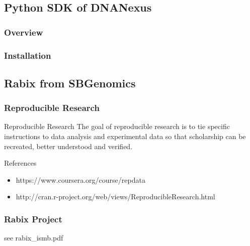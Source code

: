 \documentclass[UTF8]{beamer}
\begin{document}
\subsection{Python SDK of DNANexus}

\begin{frame}
  \frametitle{Overview}
\end{frame}

\begin{frame}
  \frametitle{Installation}
\end{frame}

\subsection{Rabix from SBGenomics}

\begin{frame}
  \frametitle{Reproducible Research}
  \begin{block}{Reproducible Research}
The goal of reproducible research is to tie specific instructions to data
analysis and experimental data so that scholarship can be recreated, better understood and verified.
  \end{block}
  \begin{block}{References}
    \begin{itemize}
      \item https://www.coursera.org/course/repdata
      \item http://cran.r-project.org/web/views/ReproducibleResearch.html
    \end{itemize}
  \end{block}
\end{frame}

\begin{frame}
  \frametitle{Rabix Project}
  see rabix_ismb.pdf
\end{frame}
\end{document}

